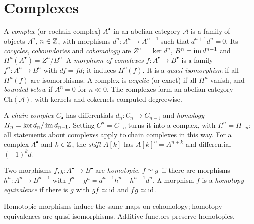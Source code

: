 \section{Complexes}\label{homological-algebra:section-complexes}

\begin{definition}\label{homological-algebra:definition-complex}
A \emph{complex} (or cochain complex) $A^\bullet$ in an abelian category $\mathcal{A}$ is a family of objects $A^n$,
$n \in \mathbb{Z}$, with morphisms $d^n \colon A^n \to A^{n+1}$ such that $d^{n+1}d^n = 0$. Its \emph{cocycles}, \emph{coboundaries} and
\emph{cohomology} are $Z^n = \ker d^n$, $B^n = \operatorname{im} d^{n-1}$ and $H^n(A^\bullet) = Z^n/B^n$. A \emph{morphism of complexes}
$f \colon A^\bullet \to B^\bullet$ is a family $f^n \colon A^n \to B^n$ with $df = fd$; it induces $H^n(f)$. It is a
\emph{quasi-isomorphism} if all $H^n(f)$ are isomorphisms. A complex is \emph{acyclic} (or exact) if all $H^n$ vanish, and
\emph{bounded below} if $A^n = 0$ for $n \ll 0$. The complexes form an abelian category $\mathrm{Ch}(\mathcal{A})$, with
kernels and cokernels computed degreewise.
\end{definition}

\begin{notation}\label{homological-algebra:notation-chain-complexes}
A \emph{chain complex} $C_\bullet$ has differentials $d_n \colon C_n \to C_{n-1}$ and \emph{homology}
$H_n = \ker d_n/\operatorname{im} d_{n+1}$. Setting $C^n = C_{-n}$ turns it into a complex, with $H^n = H_{-n}$; all statements about
complexes apply to chain complexes in this way. For a complex $A^\bullet$ and $k \in \mathbb{Z}$, the \emph{shift} $A[k]$ has
$A[k]^n = A^{n+k}$ and differential $(-1)^kd$.
\end{notation}

\begin{definition}\label{homological-algebra:definition-homotopy}
Two morphisms $f, g \colon A^\bullet \to B^\bullet$ are \emph{homotopic}, $f \simeq g$, if there are morphisms
$h^n \colon A^n \to B^{n-1}$ with $f^n - g^n = d^{n-1}h^n + h^{n+1}d^n$. A morphism $f$ is a \emph{homotopy equivalence} if there
is $g$ with $gf \simeq \mathrm{id}$ and $fg \simeq \mathrm{id}$.
\end{definition}

\begin{lemma}\label{homological-algebra:lemma-homotopy-invariance}
Homotopic morphisms induce the same maps on cohomology; homotopy equivalences are quasi-isomorphisms. Additive
functors preserve homotopies.
\end{lemma}

